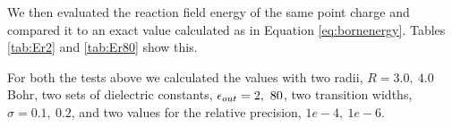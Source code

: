 \documentclass[../Thesis.tex]{subfiles}
\begin{document}
We then evaluated the reaction field energy of the same point charge and compared it
to an exact value calculated as in Equation  \ref{eq:bornenergy}. Tables \ref{tab:Er2}
and \ref{tab:Er80} show this.

For both the tests above we calculated the values with two radii, $R = 3.0,\ 4.0$ Bohr,
two sets of dielectric constants, $\epsilon_{out} = 2,\ 80$, two transition widths, $\sigma = 0.1,\ 0.2$,
and two values for the relative precision, $1e-4,\ 1e-6$.

\begin{table}[!htbp]
\caption[Reaction charge for $\epsinf = 2$]{Reaction charge for a point charge of $q = 3$ and $\epsinf = 2$ calculated with differing precision, transition width ($\sigma$) and cavity radius (Bohr) compared to the exact values}
\label{tab:Intgamma2}
\end{table}
\end{document}
